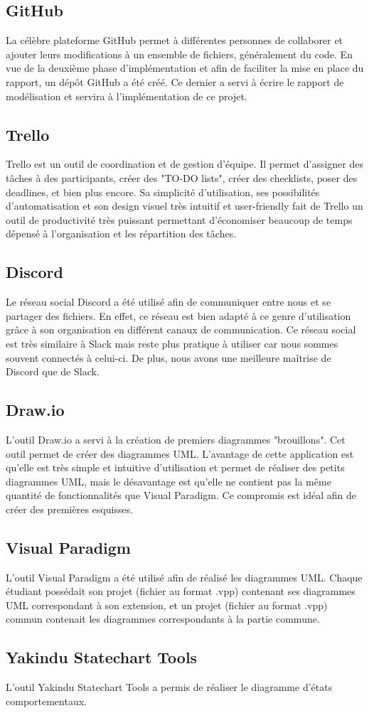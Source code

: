\subsection{GitHub} La célèbre plateforme GitHub permet à différentes personnes de collaborer et ajouter leurs modifications à un ensemble de fichiers, généralement du code. 
En vue de la deuxième phase d'implémentation et afin de faciliter la mise en place du rapport, un dépôt GitHub a été créé. 
Ce dernier a servi à écrire le rapport de modélisation et servira à l'implémentation de ce projet.

\subsection{Trello} Trello est un outil de coordination et de gestion d'équipe. 
Il permet d'assigner des tâches à des participants, créer des "TO-DO lists", créer des checklists, 
poser des deadlines, et bien plus encore. Sa simplicité d'utilisation, ses possibilités d'automatisation et son design visuel très intuitif et 
user-friendly fait de Trello un outil de productivité très puissant permettant d'économiser beaucoup de temps dépensé à l'organisation et les répartition des tâches.

\subsection{Discord} Le réseau social Discord a été utilisé afin de communiquer entre nous et se partager des fichiers.
En effet, ce réseau est bien adapté à ce genre d'utilisation grâce à son organisation en différent canaux de communication. 
Ce réseau social est très similaire à Slack mais reste plus pratique à utiliser car nous sommes souvent connectés à celui-ci.
De plus, nous avons une meilleure maîtrise de Discord que de Slack.

\subsection{Draw.io} L'outil Draw.io a servi à la création de premiers diagrammes "brouillons". 
Cet outil permet de créer des diagrammes UML. 
L'avantage de cette application est qu'elle est très simple et intuitive d'utilisation et permet de réaliser des petits diagrammes UML,
mais le désavantage est qu'elle ne contient pas la même quantité de fonctionnalités que Visual Paradigm. 
Ce compromis est idéal afin de créer des premières esquisses.

\subsection{Visual Paradigm} L'outil Visual Paradigm a été utilisé afin de réalisé les diagrammes UML. 
Chaque étudiant possédait son projet (fichier au format .vpp) contenant ses diagrammes UML correspondant à son extension, 
et un projet (fichier au format .vpp) commun contenait les diagrammes correspondants à la partie commune.

\subsection{Yakindu Statechart Tools} L'outil Yakindu Statechart Tools a permis de réaliser le diagramme d'états comportementaux.
\newpage